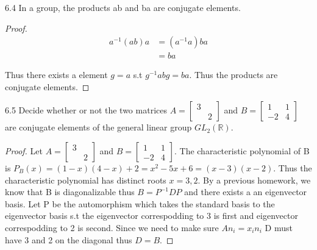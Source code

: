 \documentclass{article}
\newcommand{\R}{\mathbb{R}}
\begin{document}
\bigskip

\begin{claim}{6.4}
    In a group, the products ab and ba are conjugate elements.
\end{claim}
\begin{proof}
    \begin{align*}{}
        a^{-1}(ab)a &= (a^{-1}a)ba \\
        &= ba
    \end{align*}

    Thus there exists a element $g=a$ s.t $g^{-1}abg = ba$. Thus the products are conjugate elements.
\end{proof}

\bigskip

\begin{PROB}{6.5}\label{Problem 6.5.}
    Decide whether or not the two matrices $A = \begin{bmatrix}
        3 & \\
        & 2
    \end{bmatrix}$ and $B = \begin{bmatrix}{}
        1 & 1 \\
        -2 & 4
    \end{bmatrix}$ are conjugate
    elements of the general linear group $GL_2(\R)$.
\end{PROB}
\begin{proof}
    Let $A = \begin{bmatrix}
        3 & \\
        & 2
    \end{bmatrix}$ and $B = \begin{bmatrix}{}
        1 & 1 \\
        -2 & 4
    \end{bmatrix}$. The characteristic polynomial of B is $P_B(x) = (1-x)(4-x)+2= x^2 -5x + 6 = (x -3)(x-2)$. Thus the characteristic polynomial has distinct roots $x = 3, 2$. By a previous homework, we know that B is diagonalizable thus $B = P^{-1}DP$ and there exists a an eigenvector basis. Let P be the automorphism which takes the standard basis to the eigenvector basis s.t the eigenvector correspodding to 3 is first and eigenvector correspodding to 2 is second. Since we need to make sure $An_i = x_in_i$ D must have 3 and 2 on the diagonal thus $D = B$.
\end{proof}

\bigskip
\end{document}
